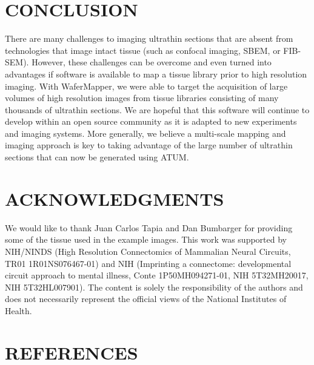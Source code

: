 \documentclass{article}
\begin{document}
\section*{CONCLUSION}

There are many challenges to imaging ultrathin sections that are absent from technologies that image intact tissue (such as confocal imaging, SBEM, or FIB-SEM). However, these challenges can be overcome and even turned into advantages if software is available to map a tissue library prior to high resolution imaging. With WaferMapper, we were able to target the acquisition of large volumes of high resolution images from tissue libraries consisting of many thousands of ultrathin sections. We are hopeful that this software will continue to develop within an open source community as it is adapted to new experiments and imaging systems. More generally, we believe a multi-scale mapping and imaging approach is key to taking advantage of the large number of ultrathin sections that can now be generated using ATUM.

\section*{ACKNOWLEDGMENTS}

We would like to thank Juan Carlos Tapia and Dan Bumbarger for providing some of the tissue used in the example images. This work was supported by NIH/NINDS (High Resolution Connectomics of Mammalian Neural Circuits, TR01 1R01NS076467-01) and NIH (Imprinting a connectome: developmental circuit approach to mental illness, Conte 1P50MH094271-01, NIH 5T32MH20017, NIH 5T32HL007901). The content is solely the responsibility of the authors and does not necessarily represent the official views of the National Institutes of Health.

\section*{REFERENCES}
\end{document}
